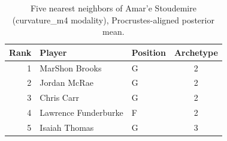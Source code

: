 \begin{table}[htbp]
  \centering\small
  \begin{tabular}{rllc}
    \toprule
    Rank & Player & Position & Archetype \\
    \midrule
    1 & MarShon Brooks & G & 2 \\
    2 & Jordan McRae & G & 2 \\
    3 & Chris Carr & G & 2 \\
    4 & Lawrence Funderburke & F & 2 \\
    5 & Isaiah Thomas & G & 3 \\
    \bottomrule
  \end{tabular}
  \caption{Five nearest neighbors of Amar'e Stoudemire (curvature_m4 modality), Procrustes-aligned posterior mean.}
  \label{tab:Amar_e_Stoudemire_neighbors_curvature_m4}
\end{table}

